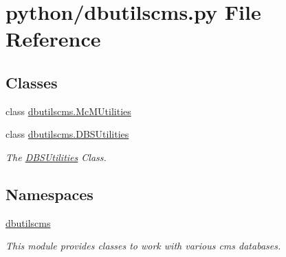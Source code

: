 \section{python/dbutilscms.py File Reference}
\label{dbutilscms_8py}
\subsection*{Classes}
\begin{DoxyCompactItemize}
\item 
class \hyperlink{classdbutilscms_1_1McMUtilities}{dbutilscms.\-Mc\-M\-Utilities}
\item 
class \hyperlink{classdbutilscms_1_1DBSUtilities}{dbutilscms.\-D\-B\-S\-Utilities}
\begin{DoxyCompactList}\small\item\em The \hyperlink{classdbutilscms_1_1DBSUtilities}{D\-B\-S\-Utilities} Class. \end{DoxyCompactList}\end{DoxyCompactItemize}
\subsection*{Namespaces}
\begin{DoxyCompactItemize}
\item 
\hyperlink{namespacedbutilscms}{dbutilscms}
\begin{DoxyCompactList}\small\item\em This module provides classes to work with various cms databases. \end{DoxyCompactList}\end{DoxyCompactItemize}
